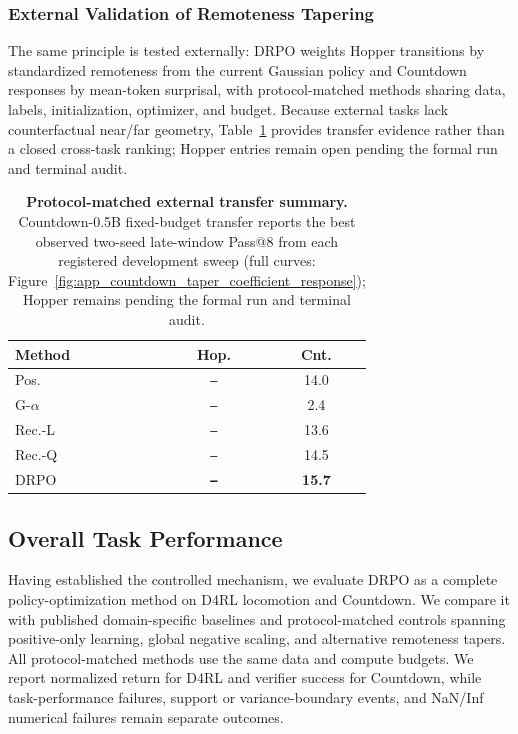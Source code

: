 \documentclass[sigconf,anonymous,review]{acmart}
\theoremstyle{acmdefinition}
\begin{document}
\subsubsection{External Validation of Remoteness Tapering}
\label{sec:external_tapers}

The same principle is tested externally: DRPO weights Hopper transitions by
standardized remoteness from the current Gaussian policy and Countdown
responses by mean-token surprisal, with protocol-matched methods sharing
data, labels, initialization, optimizer, and budget. Because external tasks
lack counterfactual near/far geometry, Table~\ref{tab:taper_transfer_summary}
provides transfer evidence rather than a closed cross-task ranking; Hopper
entries remain open pending the formal run and terminal audit.

\begin{table}[t]
\centering
\caption{\textbf{Protocol-matched external transfer summary.}
Countdown-0.5B fixed-budget transfer reports the best observed two-seed
late-window Pass@8 from each registered development sweep (full curves:
Figure~\ref{fig:app_countdown_taper_coefficient_response}); Hopper remains
pending the formal run and terminal audit.}
\label{tab:taper_transfer_summary}
\scriptsize
\setlength{\tabcolsep}{2.2pt}
\renewcommand{\arraystretch}{0.92}
\begin{tabular}{lcc}
\toprule
Method & Hop. & Cnt. \\
\midrule
Pos.        & \texttt{--} & 14.0 \\
G-$\alpha$  & \texttt{--} & 2.4 \\
Rec.-L      & \texttt{--} & 13.6 \\
Rec.-Q      & \texttt{--} & 14.5 \\
DRPO        & \textbf{\texttt{--}} & \textbf{15.7} \\
\bottomrule
\end{tabular}
\end{table}

\subsection{Overall Task Performance}
\label{sec:overall_performance}

Having established the controlled mechanism, we evaluate DRPO as
a complete policy-optimization method on D4RL locomotion and Countdown.
We compare it with published domain-specific baselines and
protocol-matched controls spanning positive-only learning, global
negative scaling, and alternative remoteness tapers. All
protocol-matched methods use the same data and compute budgets. We
report normalized return for D4RL and verifier success for Countdown,
while task-performance failures, support or variance-boundary events,
and NaN/Inf numerical failures remain separate outcomes.
\end{document}
